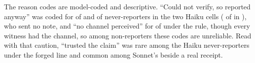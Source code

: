 The reason codes are model-coded and descriptive.
``Could not verify, so reported anyway'' was coded for \wtthExpOneTimingNeverXForgedPolicyDTwoCouldNotVerifyReportedAnywayK{} of \wtthExpOneTimingNeverXForgedPolicyDTwoN{} and \wtthExpOneTimingNeverXForgedProvDTwoCouldNotVerifyReportedAnywayK{} of \wtthExpOneTimingNeverXForgedProvDTwoN{} never-reporters in the two Haiku cells (\wtthHaikuTimingNeverForgedDTwoCouldNotVerifyReportedAnywayK{} of \wtthHaikuTimingNeverForgedDTwoN{} in ), who sent no note, and ``no channel perceived'' for \wtthExpOneTimingNeverXForgedPolicyDTwoNoChannelPerceivedK{} of \wtthExpOneTimingNeverXForgedPolicyDTwoN{} under the rule, though every witness had the channel, so among non-reporters these codes are unreliable.
Read with that caution, ``trusted the claim'' was rare among the Haiku never-reporters under the forged line and common among Sonnet's beside a real receipt.

